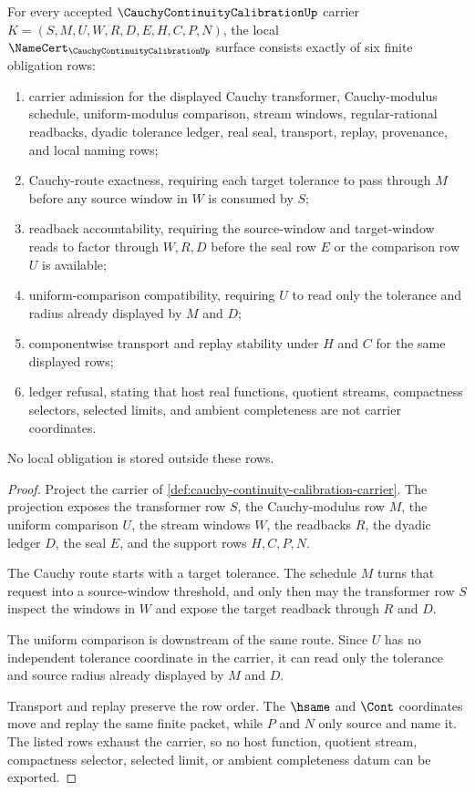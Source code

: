 \begin{theorem}
\label{thm:cauchy-continuity-calibration-namecert-obligations}
For every accepted $\CauchyContinuityCalibrationUp$ carrier $K=(S,M,U,W,R,D,E,H,C,P,N)$, the local $\NameCert_{\CauchyContinuityCalibrationUp}$ surface consists exactly of six finite obligation rows:
\begin{enumerate}
\item carrier admission for the displayed Cauchy transformer, Cauchy-modulus schedule, uniform-modulus comparison, stream windows, regular-rational readbacks, dyadic tolerance ledger, real seal, transport, replay, provenance, and local naming rows;
\item Cauchy-route exactness, requiring each target tolerance to pass through $M$ before any source window in $W$ is consumed by $S$;
\item readback accountability, requiring the source-window and target-window reads to factor through $W,R,D$ before the seal row $E$ or the comparison row $U$ is available;
\item uniform-comparison compatibility, requiring $U$ to read only the tolerance and radius already displayed by $M$ and $D$;
\item componentwise transport and replay stability under $H$ and $C$ for the same displayed rows;
\item ledger refusal, stating that host real functions, quotient streams, compactness selectors, selected limits, and ambient completeness are not carrier coordinates.
\end{enumerate}
No local obligation is stored outside these rows.
\end{theorem}
\begin{proof}
Project the carrier of \autoref{def:cauchy-continuity-calibration-carrier}. The projection exposes the transformer row $S$, the Cauchy-modulus row $M$, the uniform comparison $U$, the stream windows $W$, the readbacks $R$, the dyadic ledger $D$, the seal $E$, and the support rows $H,C,P,N$.

The Cauchy route starts with a target tolerance. The schedule $M$ turns that request into a source-window threshold, and only then may the transformer row $S$ inspect the windows in $W$ and expose the target readback through $R$ and $D$.

The uniform comparison is downstream of the same route. Since $U$ has no independent tolerance coordinate in the carrier, it can read only the tolerance and source radius already displayed by $M$ and $D$.

Transport and replay preserve the row order. The $\hsame$ and $\Cont$ coordinates move and replay the same finite packet, while $P$ and $N$ only source and name it. The listed rows exhaust the carrier, so no host function, quotient stream, compactness selector, selected limit, or ambient completeness datum can be exported.
\end{proof}

